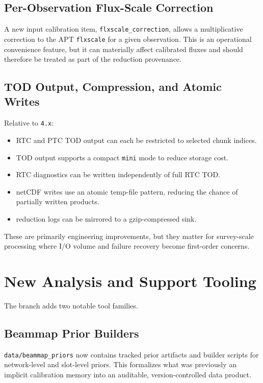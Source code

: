 \documentclass[11pt]{article}
\begin{document}
\subsection{Per-Observation Flux-Scale Correction}

A new input calibration item,
\texttt{flxscale\_correction}, allows a multiplicative correction to the APT
\texttt{flxscale} for a given observation. This is an operational convenience
feature, but it can materially affect calibrated fluxes and should therefore be
treated as part of the reduction provenance.

\subsection{TOD Output, Compression, and Atomic Writes}

Relative to \texttt{4.x}:

\begin{itemize}[leftmargin=1.5em]
\item RTC and PTC TOD output can each be restricted to selected chunk indices.
\item TOD output supports a compact \texttt{mini} mode to reduce storage cost.
\item RTC diagnostics can be written independently of full RTC TOD.
\item netCDF writes use an atomic temp-file pattern, reducing the chance of
partially written products.
\item reduction logs can be mirrored to a gzip-compressed sink.
\end{itemize}

These are primarily engineering improvements, but they matter for survey-scale
processing where I/O volume and failure recovery become first-order concerns.

\section{New Analysis and Support Tooling}

The branch adds two notable tool families.

\subsection{Beammap Prior Builders}

\texttt{data/beammap\_priors} now contains tracked prior artifacts and builder
scripts for network-level and slot-level priors. This formalizes what was
previously an implicit calibration memory into an auditable, version-controlled
data product.
\end{document}
